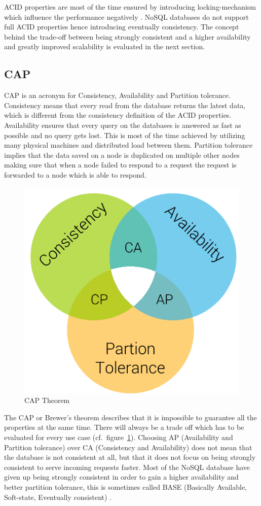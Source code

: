ACID properties are most of the time ensured by introducing locking-mechanism which influence the performance negatively \cite[1]{hecht.2011}. NoSQL databases do not support full ACID properties hence introducing eventually consistency. The concept behind the trade-off between being strongly consistent and a higher availability and greatly improved scalability is evaluated in the next section.


\subsection{CAP}
\label{subsec:cap}
CAP is an acronym for Consistency, Availability and Partition tolerance. Consistency means that every read from the database returns the latest data, which is different from the consistency definition of the ACID properties. Availability ensures that every query on the databases is answered as fast as possible and no query gets lost. This is most of the time achieved by utilizing many physical machines and distributed load between them. Partition tolerance implies that the data saved on a node is duplicated on multiple other nodes making sure that when a node failed to respond to a request the request is forwarded to a node which is able to respond. \cite[72]{pokorny.2011}

\begin{figure}[H]
  \centering
  \includegraphics[width=.4\textwidth]{Figures/cap.png}
  \caption[CAP Theorem]{CAP Theorem}
  \label{fig:cap-theorem}
\end{figure}

The CAP or Brewer's theorem describes that it is impossible to guarantee all the properties at the same time. There will always be a trade off which has to be evaluated for every use case (cf.~figure~\ref{fig:cap-theorem}). Choosing AP (Availability and Partition tolerance) over CA (Consistency and Availability) does not mean that the database is not consistent at all, but that it does not focus on being strongly consistent to serve incoming requests faster. Most of the NoSQL database have given up being strongly consistent in order to gain a higher availability and better partition tolerance, this is sometimes called BASE (Basically Available, Soft-state, Eventually consistent) \cite[4]{moniruzzaman.2013}.